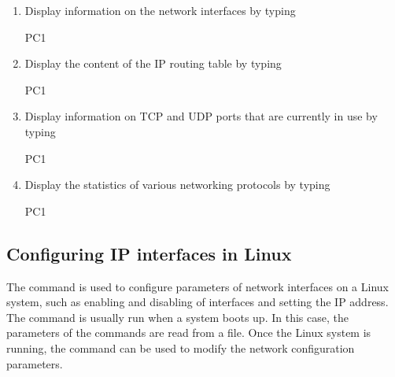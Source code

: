 \begin{enumerate}
	\item Display information on the network interfaces by typing
		\begin{cmdblock}
	PC1%
		\end{cmdblock}
	\item Display the content of the IP routing table by typing
		\begin{cmdblock}
	PC1%
		\end{cmdblock}
	\item Display information on TCP and UDP ports that are currently in use by typing
		\begin{cmdblock}
	PC1%
		\end{cmdblock}
	\item Display the statistics of various networking protocols by typing
		\begin{cmdblock}
	PC1%
		\end{cmdblock}
\end{enumerate}



\begin{questions}
\end{questions}

\newpage	
\subsection{Configuring IP interfaces in Linux}

The  command is used to configure parameters of network interfaces on a Linux system, such as enabling and disabling of interfaces and setting the IP address. The  command is usually run when a system boots up. In this case, the parameters of the commands are read from a file. Once the Linux system is running, the  command can be used to modify the network configuration parameters.

